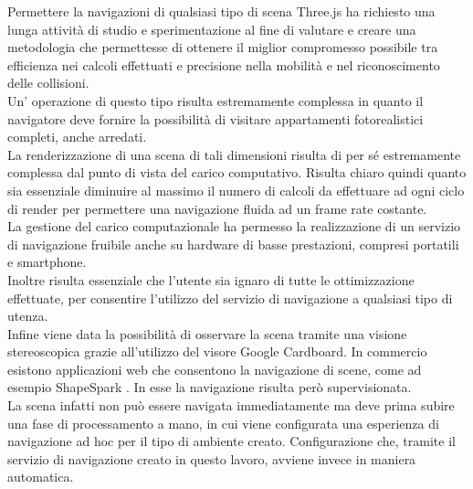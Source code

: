 Permettere la navigazioni di qualsiasi tipo di scena Three.js ha richiesto una lunga attività di studio e sperimentazione al fine di valutare e creare una metodologia che permettesse di ottenere il miglior compromesso possibile tra efficienza nei calcoli effettuati e precisione nella mobilità e nel riconoscimento delle collisioni. 
\\
Un’ operazione di questo tipo risulta estremamente complessa in quanto il navigatore deve fornire la possibilità di visitare appartamenti fotorealistici completi, anche arredati.
\\
La renderizzazione di una scena di tali dimensioni risulta di per sé estremamente complessa dal punto di vista del carico computativo. Risulta chiaro quindi quanto sia essenziale diminuire al massimo il numero di calcoli da effettuare ad ogni ciclo di render per permettere una navigazione fluida ad un frame rate costante. 
\\
La gestione del carico computazionale ha permesso la realizzazione di un servizio di navigazione fruibile anche su hardware di basse prestazioni, compresi portatili e smartphone.
\\
Inoltre risulta essenziale che l’utente sia ignaro di tutte le ottimizzazione effettuate, per consentire l’utilizzo del servizio di navigazione a qualsiasi tipo di utenza. 
\\
Infine viene data la possibilità di osservare la scena tramite una visione stereoscopica grazie all’utilizzo del visore Google Cardboard.
In commercio esistono applicazioni web che consentono la navigazione di scene, come ad esempio ShapeSpark \cite{shapespark}. In esse la navigazione risulta però supervisionata.
\\
La scena infatti non può essere navigata immediatamente ma deve prima subire una fase di processamento a mano, in cui viene configurata una esperienza di navigazione ad hoc per il tipo di ambiente creato. 
Configurazione che, tramite il servizio di navigazione creato in questo lavoro, avviene invece in maniera automatica.